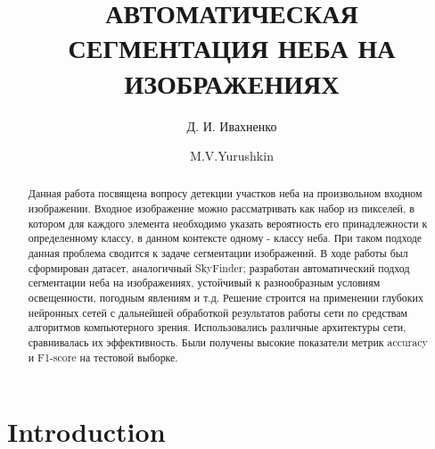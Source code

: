 \documentclass[runningheads]{llncs}
\begin{document}
%
\title{АВТОМАТИЧЕСКАЯ СЕГМЕНТАЦИЯ НЕБА НА ИЗОБРАЖЕНИЯХ}
%
%
\author{Д. И. Ивахненко \and
M.V.Yurushkin}
%
%
%
\maketitle              %
%
\begin{abstract}
Данная работа посвящена вопросу детекции участков неба на
произвольном входном изображении.
Входное изображение можно рассматривать как набор из пикселей, 
в котором для каждого элемента необходимо указать вероятность
его принадлежности к определенному классу, в данном контексте 
одному - классу неба. При таком подходе данная проблема сводится
к задаче сегментации изображений. 
В ходе работы был сформирован датасет, аналогичный SkyFinder; разработан автоматический подход сегментации 
неба на изображениях, устойчивый к разнообразным условиям освещенности, погодным явлениям и т.д. 
Решение строится на применении глубоких нейронных сетей с
дальнейшей обработкой результатов работы сети по средствам алгоритмов 
компьютерного зрения. Использовались различные архитектуры 
сети, сравнивалась их эффективность.
Были получены высокие показатели метрик accuracy и F1-score на тестовой выборке.

\end{abstract}
%
%
%

\section{Introduction}
\end{document}
